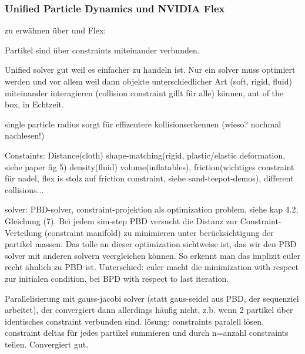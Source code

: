 \subsubsection{Unified Particle Dynamics und NVIDIA Flex}
zu erwähnen über \cite{UPP} und Flex: 

Partikel sind über constraints miteinander verbunden.

Unified solver gut weil es einfacher zu handeln ist. Nur ein solver muss optimiert werden und vor allem weil dann objekte unterschiedlicher Art (soft, rigid, fluid) miteinander interagieren (collision constraint gillt für alle) können, aut of the box, in Echtzeit.

single particle radius sorgt für effizentere kollisionserkennen (wieso? nochmal nachlesen!)

Constaints: Distance(cloth) shape-matching(rigid, plastic/elastic deformation, siehe paper fig 5) density(fluid) volume(inflatables), friction(wichtiges constraint für nadel, flex is stolz auf friction constraint, siehe sand-teepot-demos), different collisions...

solver: PBD-solver, \cite{UPP} constraint-projektion als optimization problem, siehe kap 4.2, Gleichung (7). Bei jedem sim-step PBD versucht die Distanz zur Constraint-Verteilung (constraint manifold) zu minimieren unter berücksichtigung der partikel massen. Das tolle an dieser optimization sichtweise ist, das wir den PBD solver mit anderen solvern veergleichen können. So erkennt man das implizit euler recht ähnlich zu PBD ist. Unterschied: euler macht die minimization with respect zur initialen condition. bei BPD with respect to last iteration.

Parallelisierung mit gauss-jacobi solver (statt gaus-seidel aus PBD, der sequenziel arbeitet), der convergiert dann allerdings häufig nicht, z.b. wenn 2 partikel über identisches constraint verbunden sind. lösung: constraints paralell lösen, constraint deltas für jedes partikel summieren und durch n=anzahl constraints teilen. Convergiert gut. 





%
%
%

